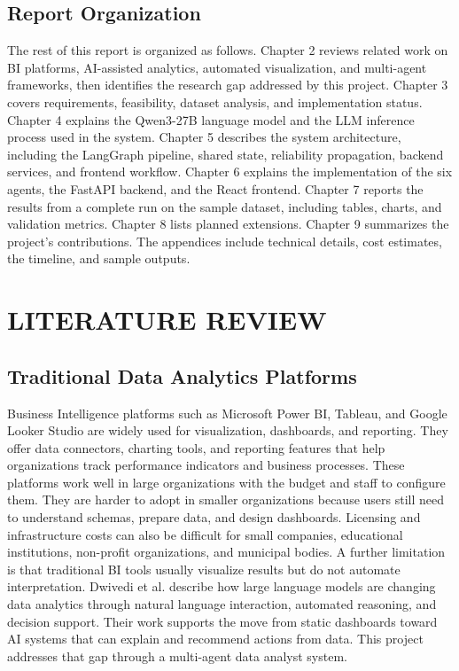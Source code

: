 \documentclass[12pt,a4paper,openany]{report}
\begin{document}
\section{Report Organization}

The rest of this report is organized as follows. Chapter 2 reviews related work on BI platforms, AI-assisted analytics, automated visualization, and multi-agent frameworks, then identifies the research gap addressed by this project. Chapter 3 covers requirements, feasibility, dataset analysis, and implementation status. Chapter 4 explains the Qwen3-27B language model and the LLM inference process used in the system. Chapter 5 describes the system architecture, including the LangGraph pipeline, shared state, reliability propagation, backend services, and frontend workflow. Chapter 6 explains the implementation of the six agents, the FastAPI backend, and the React frontend. Chapter 7 reports the results from a complete run on the sample dataset, including tables, charts, and validation metrics. Chapter 8 lists planned extensions. Chapter 9 summarizes the project's contributions. The appendices include technical details, cost estimates, the timeline, and sample outputs.

\chapter{LITERATURE REVIEW}

\section{Traditional Data Analytics Platforms}
Business Intelligence platforms such as Microsoft Power BI, Tableau, and Google Looker Studio are widely used for visualization, dashboards, and reporting. They offer data connectors, charting tools, and reporting features that help organizations track performance indicators and business processes. These platforms work well in large organizations with the budget and staff to configure them. They are harder to adopt in smaller organizations because users still need to understand schemas, prepare data, and design dashboards. Licensing and infrastructure costs can also be difficult for small companies, educational institutions, non-profit organizations, and municipal bodies. A further limitation is that traditional BI tools usually visualize results but do not automate interpretation.
Dwivedi et al. \cite{dwivedi2023} describe how large language models are changing data analytics through natural language interaction, automated reasoning, and decision support. Their work supports the move from static dashboards toward AI systems that can explain and recommend actions from data. This project addresses that gap through a multi-agent data analyst system.
\end{document}
